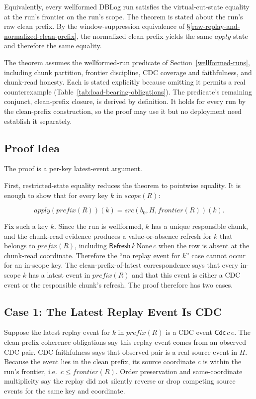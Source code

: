 \documentclass[letterpaper,10pt,twocolumn]{article}
\newcommand{\Apply}{\mathit{apply}}
\newcommand{\Src}{\mathit{src}}
\newcommand{\Scope}{\mathit{scope}}
\newcommand{\Frontier}{\mathit{frontier}}
\newcommand{\CleanPrefix}{\mathit{prefix}}
\newcommand{\None}{\mathrm{None}}
\begin{document}
Equivalently, every wellformed DBLog run satisfies the virtual-cut-state
equality at the run's frontier on the run's scope. The theorem is stated
about the run's raw clean prefix. By the window-suppression equivalence
of \S\ref{raw-replay-and-normalized-clean-prefix}, the normalized clean
prefix yields the same $\Apply$ state and therefore the same equality.

The theorem assumes the wellformed-run predicate of
Section~\ref{wellformed-runs}, including chunk partition, frontier
discipline, CDC coverage and faithfulness, and chunk-read honesty. Each
is stated explicitly because omitting it permits a real counterexample
(Table~\ref{tab:load-bearing-obligations}). The predicate's remaining
conjunct, clean-prefix closure, is derived by definition. It holds
for every run by the clean-prefix construction, so the proof may use it
but no deployment need establish it separately.

\subsection{Proof Idea}\label{proof-idea}

The proof is a per-key latest-event argument.

First, restricted-state equality reduces the theorem to pointwise
equality. It is enough to show that for every key $k$ in
$\Scope(R)$:

\[
  \Apply(\CleanPrefix(R))(k) = \Src(b_0,H,\Frontier(R))(k).
\]

Fix such a key $k$. Since the run is wellformed, $k$ has a
unique responsible chunk, and the chunk-read evidence produces a
value-or-absence refresh for $k$ that belongs to $\CleanPrefix(R)$,
including $\mathsf{Refresh}\,k\,\None\,c$ when the row is absent at the
chunk-read coordinate. Therefore the ``no replay event for $k$'' case
cannot occur for an in-scope key. The clean-prefix-of-latest
correspondence says that every in-scope $k$ has a latest event in
$\CleanPrefix(R)$ and that this event is either a CDC event or the
responsible chunk's refresh. The proof therefore has two cases.

\subsection{Case 1: The Latest Replay Event Is
CDC}\label{case-1-the-latest-replay-event-is-cdc}

Suppose the latest replay event for $k$ in
$\CleanPrefix(R)$ is a CDC event $\mathsf{Cdc}\,c\,e$. The
clean-prefix coherence obligations say this replay event comes from an
observed CDC pair. CDC faithfulness says that observed pair is a real
source event in $H$. Because the event lies in the clean prefix, its
source coordinate $c$ is within the run's frontier, i.e.\ $c \le
\Frontier(R)$. Order preservation and same-coordinate
multiplicity say the replay did not silently reverse or drop competing
source events for the same key and coordinate.
\end{document}
